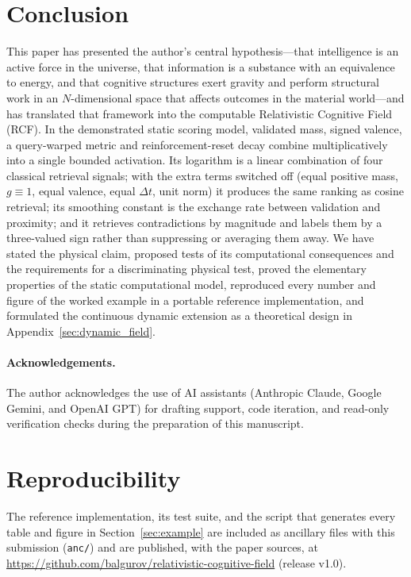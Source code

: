 \documentclass[11pt]{article}
\theoremstyle{remark}
\begin{document}
\section{Conclusion}

This paper has presented the author's central hypothesis---that intelligence is an active force in the universe, that information is a substance with an equivalence to energy, and that cognitive structures exert gravity and perform structural work in an $N$-dimensional space that affects outcomes in the material world---and has translated that framework into the computable Relativistic Cognitive Field (RCF). In the demonstrated static scoring model, validated mass, signed valence, a query-warped metric and reinforcement-reset decay combine multiplicatively into a single bounded activation. Its logarithm is a linear combination of four classical retrieval signals; with the extra terms switched off (equal positive mass, $g\equiv 1$, equal valence, equal $\Delta t$, unit norm) it produces the same ranking as cosine retrieval; its smoothing constant is the exchange rate between validation and proximity; and it retrieves contradictions by magnitude and labels them by a three-valued sign rather than suppressing or averaging them away. We have stated the physical claim, proposed tests of its computational consequences and the requirements for a discriminating physical test, proved the elementary properties of the static computational model, reproduced every number and figure of the worked example in a portable reference implementation, and formulated the continuous dynamic extension as a theoretical design in Appendix~\ref{sec:dynamic_field}.

\paragraph{Acknowledgements.}
The author acknowledges the use of AI assistants (Anthropic Claude, Google Gemini, and OpenAI GPT) for drafting support, code iteration, and read-only verification checks during the preparation of this manuscript.

\section*{Reproducibility}

The reference implementation, its test suite, and the script that generates every table and figure in Section~\ref{sec:example} are included as ancillary files with this submission (\texttt{anc/}) and are published, with the paper sources, at \url{https://github.com/balgurov/relativistic-cognitive-field} (release v1.0).
\end{document}

